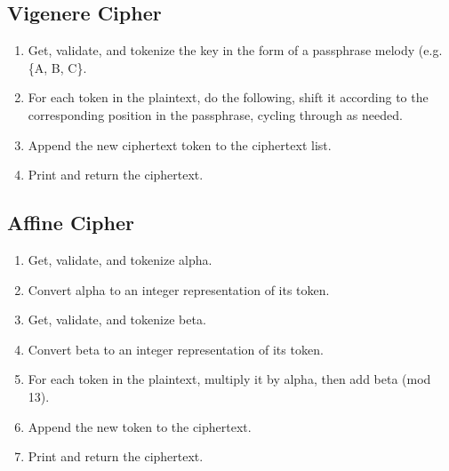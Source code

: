 \documentclass[14pt]{article}
\begin{document}
    	\subsection{Vigenere Cipher}
        \begin{enumerate}
            \item Get, validate, and tokenize the key in the form of a passphrase melody (e.g. \{A, B, C\}.
            \item For each token in the plaintext, do the following, shift it according to the corresponding position in the passphrase, cycling through as needed.
            \item Append the new ciphertext token to the ciphertext list.
            \item Print and return the ciphertext.
        \end{enumerate}
        
    	\subsection{Affine Cipher}
        \begin{enumerate}
            \item Get, validate, and tokenize alpha.
            \item Convert alpha to an integer representation of its token.
            \item Get, validate, and tokenize beta.
            \item Convert beta to an integer representation of its token.
            \item For each token in the plaintext, multiply it by alpha, then add beta (mod 13).
            \item Append the new token to the ciphertext.
            \item Print and return the ciphertext.
        \end{enumerate}
        
\end{document}
